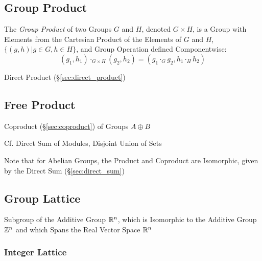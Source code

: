 \subsection{Group Product}\label{sec:group_product}

The \emph{Group Product} of two Groups $G$ and $H$, denoted $G \times
H$, is a Group with Elements from the Cartesian Product of the
Elements of $G$ and $H$, $\{(g,h) | g \in G, h \in H\}$, and Group
Operation defined Componentwise:
\[
    (g_1, h_1) \cdot_{G \times H} (g_2, h_2)
    = (g_1 \cdot_G g_2, h_1 \cdot_H h_2)
\]

Direct Product (\S\ref{sec:direct_product})



\subsection{Free Product}\label{sec:free_product}

Coproduct (\S\ref{sec:coproduct}) of Groups $A \oplus B$

\fist Cf. Direct Sum of Modules, Disjoint Union of Sets

\fist Note that for Abelian Groups, the Product and Coproduct
are Isomorphic, given by the Direct Sum (\S\ref{sec:direct_sum})



\subsection{Group Lattice}\label{sec:group_lattice}

Subgroup of the Additive Group $\mathbb{R}^n$, which is Isomorphic to the Additive
Group $\mathbb{Z}^n$ and which Spans the Real Vector Space $\mathbb{R}^n$



\subsubsection{Integer Lattice}\label{sec:integer_lattice}



